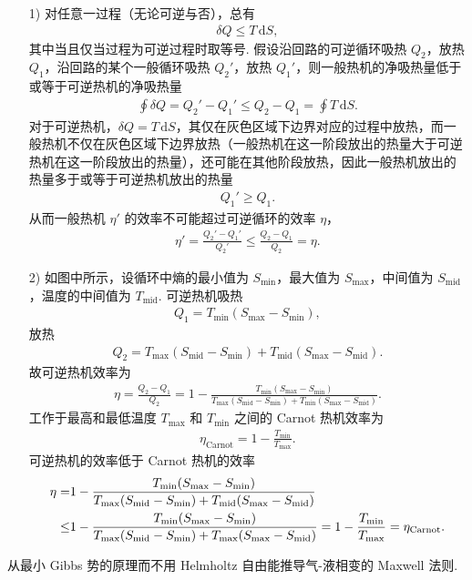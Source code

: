 \documentclass{assignment}
\begin{document}
\begin{pf}
    \begin{itemize}
        \item[1)] 对任意一过程（无论可逆与否），总有
        \begin{align}
            \delta Q\leq T\,\mathrm{d}S,
        \end{align}
        其中当且仅当过程为可逆过程时取等号. 假设沿回路的可逆循环吸热 $Q_2$，放热 $Q_1$，沿回路的某个一般循环吸热 $Q_2'$，放热 $Q_1'$，则一般热机的净吸热量低于或等于可逆热机的净吸热量
        \begin{align}
            \oint\delta Q=Q_2'-Q_1'\leq Q_2-Q_1=\oint T\,\mathrm{d}S.
        \end{align}
        对于可逆热机，$\delta Q=T\,\mathrm{d}S$，其仅在灰色区域下边界对应的过程中放热，而一般热机不仅在灰色区域下边界放热（一般热机在这一阶段放出的热量大于可逆热机在这一阶段放出的热量），还可能在其他阶段放热，因此一般热机放出的热量多于或等于可逆热机放出的热量
        \begin{align}
            Q_1'\geq Q_1.
        \end{align}
        从而一般热机 $\eta'$ 的效率不可能超过可逆循环的效率 $\eta$，
        \begin{align}
            \eta'=\frac{Q_2'-Q_1'}{Q_2'}\leq\frac{Q_2-Q_1}{Q_2}=\eta.
        \end{align}
        \item[2)] 如图中所示，设循环中熵的最小值为 $S_{\min}$，最大值为 $S_{\max}$，中间值为 $S_{\text{mid}}$，温度的中间值为 $T_{\text{mid}}$. 可逆热机吸热
        \begin{align}
            Q_1=T_{\min}(S_{\max}-S_{\min}),
        \end{align}
        放热
        \begin{align}
            Q_2=T_{\max}(S_{\text{mid}}-S_{\min})+T_{\text{mid}}(S_{\max}-S_{\text{mid}}).
        \end{align}
        故可逆热机效率为
        \begin{align}
            \eta=\frac{Q_2-Q_1}{Q_2}=1-\frac{T_{\min}(S_{\max}-S_{\min})}{T_{\max}(S_{\text{mid}}-S_{\text{min}})+T_{\min}(S_{\max}-S_{\text{mid}})}.
        \end{align}
        工作于最高和最低温度 $T_{\max}$ 和 $T_{\min}$ 之间的 Carnot 热机效率为
        \begin{align}
            \eta_{\text{Carnot}}=1-\frac{T_{\min}}{T_{\max}}.
        \end{align}
        可逆热机的效率低于 Carnot 热机的效率
        \begin{align}
            \notag\eta=&1-\frac{T_{\min}(S_{\max}-S_{\min})}{T_{\max}(S_{\text{mid}}-S_{\text{min}})+T_{\text{mid}}(S_{\max}-S_{\text{mid}})}\\
            \leq&1-\frac{T_{\min}(S_{\max}-S_{\min})}{T_{\max}(S_{\text{mid}}-S_{\text{min}})+T_{\max}(S_{\max}-S_{\text{mid}})}=1-\frac{T_{\min}}{T_{\max}}=\eta_{\text{Carnot}}.
        \end{align}
    \end{itemize}
\end{pf}

\begin{prob}
    从最小 Gibbs 势的原理而不用 Helmholtz 自由能推导气-液相变的 Maxwell 法则.
\end{prob}
\begin{pf}
    
\end{pf}
\end{document}
